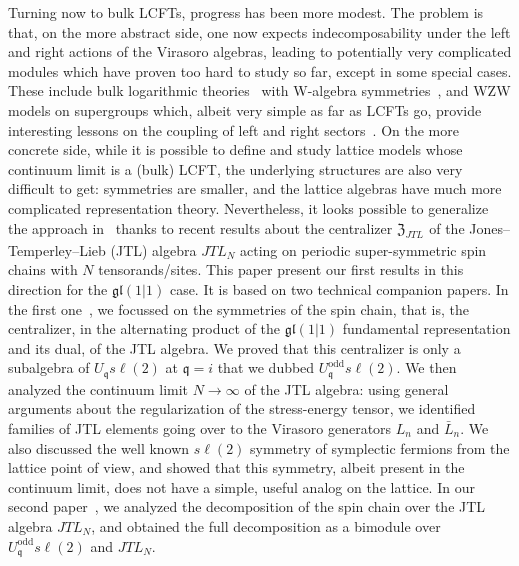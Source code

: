 \documentclass[11pt]{article}
\newcommand{\q}{\mathfrak{q}}
\newcommand{\JTL}[1]{JTL_{#1}}
\newcommand{\LQG}{U_{\q} s\ell(2)}
\newcommand{\LQGodd}{U^{\text{odd}}_{\q} s\ell(2)}
\newcommand{\SU}{s\ell}
\newcommand{\gl}{\mathfrak{gl}}
\newcommand{\cent}{\mathfrak{Z}}
\newcommand{\centJTL}{\cent_{\JTL{}}}
\theoremstyle{definition}
\begin{document}
Turning now to bulk LCFTs, progress has been more modest. The problem
is that, on the more abstract side, one now expects indecomposability
under the left and right actions of the Virasoro algebras, leading to
potentially very complicated modules which have proven too hard to
study so far, except in some special cases. These include bulk
logarithmic theories~\cite{GabRun,GabRunW} with W-algebra
symmetries~\cite{[K-first],[FGST3]}, and WZW models on
supergroups which, albeit very simple as far as LCFTs go, provide
interesting lessons on the coupling of left and right
sectors~\cite{SaleurSchomerus}. On the more concrete side, while it is
possible to define and study lattice models whose continuum limit is a
(bulk) LCFT, the underlying structures are also very difficult to get:
symmetries are smaller, and the lattice algebras have much more
complicated representation theory. Nevertheless, it looks possible
to generalize the approach in~\cite{ReadSaleur07-1,ReadSaleur07-2}
thanks to recent results about  the centralizer $\centJTL$ of the Jones--Temperley--Lieb (JTL)
 algebra $\JTL{N}$ acting on periodic super-symmetric spin chains  with $N$ tensorands/sites. This
paper present our first results in this direction for the $\gl(1|1)$
case. It is based on two technical companion papers.  In the first one~\cite{GRS1},
we focussed on the symmetries of the spin chain, that is, the
centralizer, in the alternating product of the $\gl(1|1)$ fundamental
representation and its dual, of the JTL algebra. We proved that this
centralizer is only a subalgebra of $\LQG$ at $\q=i$ that we dubbed
$\LQGodd$. We then analyzed the continuum limit $N\to\infty$ of the JTL algebra:
using general arguments about the regularization of the stress-energy tensor, we identified families of JTL elements going over to
the Virasoro generators $L_n$ and $\bar{L}_n$. We also discussed the well
known $\SU(2)$ symmetry of symplectic fermions from the lattice point
of view, and showed that this symmetry, albeit present in the
continuum limit, does not have a simple, useful analog on the lattice.
In our second paper~\cite{GRS2}, we analyzed the decomposition of the spin chain over
the JTL algebra $\JTL{N}$, and obtained the full decomposition
as a bimodule over $\LQGodd$ and $\JTL{N}$.
\end{document}
